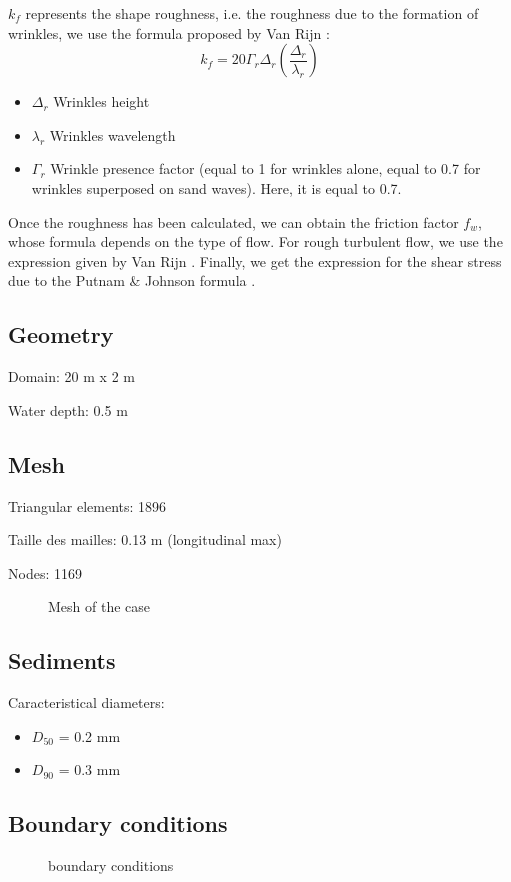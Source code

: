 $k_f$ represents the shape roughness, i.e. the roughness due to the formation of wrinkles, we use the formula proposed by Van Rijn \cite{VanRijn1993}:
$$
k_f = 20 \Gamma_r \Delta_r (\frac{\Delta_r}{\lambda_r})
$$
\begin{itemize}
\item $\Delta_r$ Wrinkles height
\item $\lambda_r$ Wrinkles wavelength
\item $\Gamma_r$ Wrinkle presence factor (equal to 1 for wrinkles alone, equal to 0.7 for wrinkles
  superposed on sand waves). Here, it is equal to 0.7.
  \end{itemize}

Once the roughness has been calculated, we can obtain the friction factor $f_w$,
whose formula depends on the type of flow. For rough turbulent flow, we use the
expression given by Van Rijn \cite{VanRijn1993}. Finally, we get the expression
for the shear stress due to the Putnam \& Johnson formula \cite{Putnam1949}.

\subsection{Geometry}
Domain: 20 m x 2 m

Water depth: 0.5 m
\subsection{Mesh}
Triangular elements: 1896

Taille des mailles: 0.13 m (longitudinal max)

Nodes: 1169

\begin{figure}[h]
\begin{center}
\end{center}
\caption{Mesh of the case}
\label{fig:friction_Mesh}
\end{figure}

\subsection{Sediments}
Caracteristical diameters:
\begin{itemize}
\item $D_{50}$ = 0.2 mm
\item $D_{90}$ = 0.3 mm
\end{itemize}

\subsection{Boundary conditions}
\begin{figure}[h]
\begin{center}
\end{center}
\caption{boundary conditions}
\label{fig:friction_boundary}
\end{figure}


